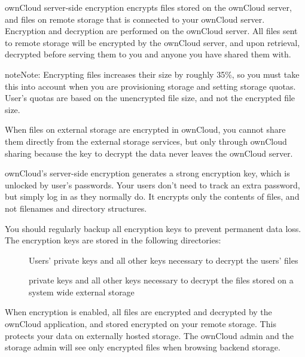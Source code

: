 \documentclass[letterpaper,10pt,english]{sphinxmanual}
\begin{document}
ownCloud server-side encryption encrypts files stored on the ownCloud server,
and files on remote storage that is connected to your ownCloud server.
Encryption and decryption are performed on the ownCloud server. All files sent
to remote storage will be encrypted by the ownCloud server, and upon retrieval,
decrypted before serving them to you and anyone you have shared them with.

\begin{notice}{note}{Note:}
Encrypting files increases their size by roughly 35\%, so you must
take this into account when you are provisioning storage and setting
storage quotas. User's quotas are based on the unencrypted file size, and
not the encrypted file size.
\end{notice}

When files on external storage are encrypted in ownCloud, you cannot share them
directly from the external storage services, but only through ownCloud sharing
because the key to decrypt the data never leaves the ownCloud server.

ownCloud's server-side encryption generates a strong encryption key, which is
unlocked by user's passwords. Your users don't need to track an extra
password, but simply log in as they normally do. It encrypts only the contents
of files, and not filenames and directory structures.

You should regularly backup all encryption keys to prevent permanent data loss.
The encryption keys are stored in the following directories:
\begin{description}
\item[{}] \leavevmode
Users' private keys and all other keys necessary to decrypt the users' files

\item[{}] \leavevmode
private keys and all other keys necessary to decrypt the files stored on a
system wide external storage

\end{description}

When encryption is enabled, all files are encrypted and decrypted by the
ownCloud application, and stored encrypted on your remote storage.
This protects your data on externally hosted storage. The ownCloud
admin and the storage admin will see only encrypted files when browsing backend
storage.
\end{document}
